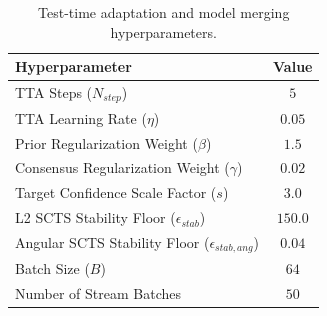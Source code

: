 \documentclass{article}
\theoremstyle{plain}
\theoremstyle{definition}
\theoremstyle{remark}
\begin{document}
\begin{table}[h]
\caption{Test-time adaptation and model merging hyperparameters.}
\label{tab:appendix_tta}
\vskip 0.1in
\begin{center}
\begin{small}
\begin{tabular}{lc}
\toprule
Hyperparameter & Value \\
\midrule
TTA Steps ($N_{step}$) & $5$ \\
TTA Learning Rate ($\eta$) & $0.05$ \\
Prior Regularization Weight ($\beta$) & $1.5$ \\
Consensus Regularization Weight ($\gamma$) & $0.02$ \\
Target Confidence Scale Factor ($s$) & $3.0$ \\
L2 SCTS Stability Floor ($\epsilon_{stab}$) & $150.0$ \\
Angular SCTS Stability Floor ($\epsilon_{stab,ang}$) & $0.04$ \\
Batch Size ($B$) & $64$ \\
Number of Stream Batches & $50$ \\
\bottomrule
\end{tabular}
\end{small}
\end{center}
\vskip -0.1in
\end{table}
\end{document}
